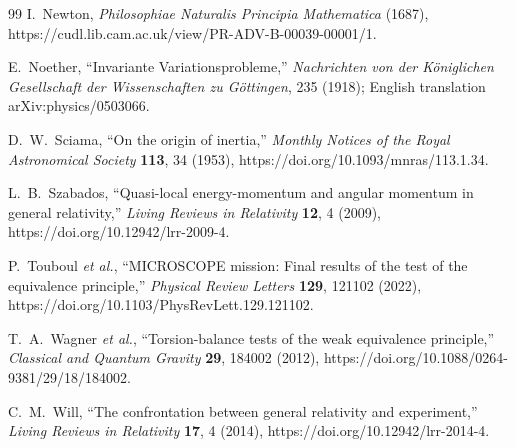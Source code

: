 \documentclass[11pt,a4paper]{article}
\theoremstyle{remark}
\begin{document}
\begin{thebibliography}{99}
I.~Newton, \emph{Philosophiae Naturalis Principia Mathematica} (1687),
https://cudl.lib.cam.ac.uk/view/PR-ADV-B-00039-00001/1.

E.~Noether, ``Invariante Variationsprobleme,'' \emph{Nachrichten von der
K\"oniglichen Gesellschaft der Wissenschaften zu G\"ottingen}, 235 (1918);
English translation arXiv:physics/0503066.

D.~W.~Sciama, ``On the origin of inertia,'' \emph{Monthly Notices of the Royal
Astronomical Society} \textbf{113}, 34 (1953),
https://doi.org/10.1093/mnras/113.1.34.

L.~B.~Szabados, ``Quasi-local energy-momentum and angular momentum in general
relativity,'' \emph{Living Reviews in Relativity} \textbf{12}, 4 (2009),
https://doi.org/10.12942/lrr-2009-4.

P.~Touboul \emph{et al.}, ``MICROSCOPE mission: Final results of the test of the
equivalence principle,'' \emph{Physical Review Letters} \textbf{129}, 121102
(2022), https://doi.org/10.1103/PhysRevLett.129.121102.

T.~A.~Wagner \emph{et al.}, ``Torsion-balance tests of the weak equivalence
principle,'' \emph{Classical and Quantum Gravity} \textbf{29}, 184002 (2012),
https://doi.org/10.1088/0264-9381/29/18/184002.

C.~M.~Will, ``The confrontation between general relativity and experiment,''
\emph{Living Reviews in Relativity} \textbf{17}, 4 (2014),
https://doi.org/10.12942/lrr-2014-4.
\end{thebibliography}
\end{document}
